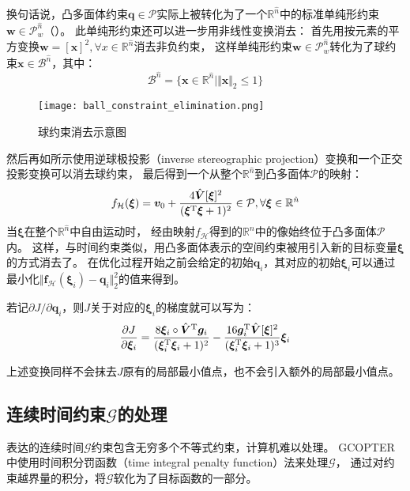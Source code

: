 换句话说，凸多面体约束$\bm{q} \in \mathcal{P}$实际上被转化为了一个$\mathbb{R}^{\hat{n}}$中的标准单纯形约束$\bm{w} \in \mathcal{P}_w^{\hat{n}}$（）。
此单纯形约束还可以进一步用非线性变换消去：
首先用按元素的平方变换$\bm{w}=[\bm{x}]^2,\forall x\in\mathbb{R}^{\hat{n}}$消去非负约束，
这样单纯形约束$\bm{w} \in \mathcal{P}_w^{\hat{n}}$转化为了球约束$\bm{x}\in\mathcal{B}^{\hat{n}}$，其中：
\begin{equation}
  \mathcal{B}^{\hat{n}} = \{ 
    \bm{x} \in \mathbb{R}^{\hat{n}} \mid \Vert \bm{x} \Vert_2 \leq 1
  \}
  \label{equ:ball_constraint}
\end{equation}
\begin{figure}[ht]
  \centering
  \texttt{[image: ball\_constraint\_elimination.png]}
  \caption{球约束消去示意图}
  \label{fig:elimination_of_ball_constraints}
\end{figure}
然后再如所示使用逆球极投影（inverse stereographic projection）变换和一个正交投影变换可以消去球约束，
最后得到一个从整个$\mathbb{R}^{\hat{n}}$到凸多面体$\mathcal{P}$的映射：
\begin{equation}
  f_{\mathcal{H}}(\bm{\xi}) = \bm{v}_0 + \frac{4\hat{\bm{V}}[\bm{\xi}]^2}{({\bm{\xi}}^{\text{T}}\bm{\xi} + 1)^2} \in \mathcal{P}, 
  \forall \bm{\xi} \in \mathbb{R}^{\hat{n}}
  \label{equ:polyhedron_constraint_elimination_map}
\end{equation}
当$\bm{\xi}$在整个$\mathbb{R}^{\hat{n}}$中自由运动时，
经由映射$f_{\mathcal{H}}$得到的$\mathbb{R}^n$中的像始终位于凸多面体$\mathcal{P}$内。
这样，与时间约束类似，用凸多面体表示的空间约束被用引入新的目标变量$\bm{\xi}$的方式消去了。
在优化过程开始之前会给定的初始$\bm{q}_i$，其对应的初始$\bm{\xi}_i$可以通过最小化$\Vert \bm{f}_{\mathcal{H}}(\bm{\xi}_i) - \bm{q}_i \Vert_2^2$的值来得到。


若记${\partial J}/{\partial \bm{q}_i}$，则$J$关于对应的$\bm{\xi}_i$的梯度就可以写为：
\begin{equation}
  \frac{\partial{J}}{\partial{\bm{\xi}_i}} = 
  \frac{8\bm{\xi}_i \circ {\hat{\bm{V}}}^{\text{T}}\bm{g}_i}{(\bm{\xi}_i^{\text{T}}\bm{\xi}_i+1)^2} - 
  \frac{16\bm{g}_i^{\text{T}}\hat{\bm{V}}[\bm{\xi}]^2}{(\bm{\xi}_i^{\text{T}}\bm{\xi}_i+1)^3}\bm{\xi}_i
  \label{equ:grad_J_xii}
\end{equation}

上述变换同样不会抹去$J$原有的局部最小值点，也不会引入额外的局部最小值点。

\subsection{连续时间约束$\mathcal{G}$的处理}\label{subsec:processing_of_continuous_time_constraints}
表达的连续时间$\mathcal{G}$约束包含无穷多个不等式约束，计算机难以处理。
GCOPTER中使用时间积分罚函数（time integral penalty function）法来处理$\mathcal{G}$，
通过对约束越界量的积分，将$\mathcal{G}$软化为了目标函数的一部分。

